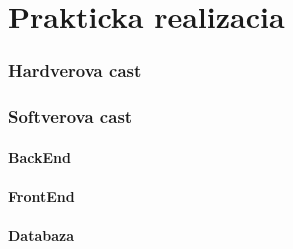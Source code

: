 \chapter{Prakticka realizacia}
\subsection{Hardverova cast}
\subsection{Softverova cast}
\subsubsection{BackEnd}
\subsubsection{FrontEnd}
\subsubsection{Databaza}
